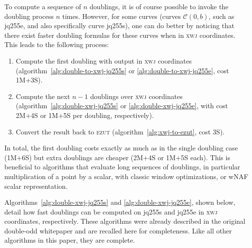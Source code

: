 \documentclass{llncs}
\newcommand{\cC}{\mathcal{C}}
\newcommand{\ezut}{\textsc{ezut}\xspace}
\newcommand{\xwj}{\textsc{xwj}\xspace}
\begin{document}
To compute a sequence of $n$ doublings, it is of course possible to
invoke the doubling process $n$ times. However, for some curves (curves
$\cC(0,b)$, such as jq255e, and also specifically curve jq255s), one can
do better by noticing that there exist faster doubling formulas for
these curves when in \xwj coordinates. This leads to the following
process:
\begin{enumerate}

    \item Compute the first doubling with output in \xwj coordinates
    (algorithm~\ref{alg:double-to-xwj-jq255s} or
    \ref{alg:double-to-xwj-jq255e}, cost 1M+3S).

    \item Compute the next $n-1$ doublings over \xwj coordinates
    (algorithm~\ref{alg:double-xwj-jq255s} or \ref{alg:double-xwj-jq255e},
    with cost 2M+4S or 1M+5S per doubling, respectively).

    \item Convert the result back to \ezut
    (algorithm~\ref{alg:xwj-to-ezut}, cost 3S).

\end{enumerate}
In total, the first doubling costs exactly as much as in the single
doubling case (1M+6S) but extra doublings are cheaper (2M+4S or 1M+5S
each). This is beneficial to algorithms that evaluate long sequences of
doublings, in particular multiplication of a point by a scalar, with
classic window optimizations, or wNAF scalar representation.

Algorithms~\ref{alg:double-xwj-jq255s} and \ref{alg:double-xwj-jq255e},
shown below, detail how fast doublings can be computed on jq255s and
jq255e in \xwj coordinates, respectively. These algorithms were already
described in the original double-odd whitepaper\cite{Por2020-5} and are
recalled here for completeness. Like all other algorithms in this paper,
they are complete.

\begin{algorithm}[H]
    \caption{\ \ Doubling on jq255s (\xwj) (cost: 2M+4S)}\label{alg:double-xwj-jq255s}
    \begin{algorithmic}[1]
        \Require{$P = (X{:}W{:}J) \in \cC(-1,1/2)$}
    \end{algorithmic}
\end{algorithm}
\end{document}
